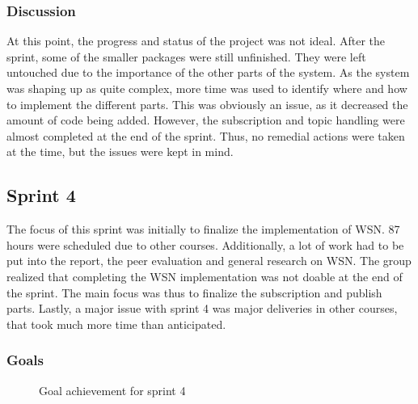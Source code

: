 \subsubsection{Discussion}

At this point, the progress and status of the project was not ideal. After the sprint, some of the smaller packages were still unfinished. They were left untouched due to the importance of the other parts of the system. As the system was shaping up as quite complex, more time was used to identify where and how to implement the different parts. This was obviously an issue, as it decreased the amount of code being added. However, the subscription and topic handling were almost completed at the end of the sprint. Thus, no remedial actions were taken at the time, but the issues were kept in mind.


\subsection{Sprint 4}

The focus of this sprint was initially to finalize the implementation of WSN. 87 hours were scheduled due to other courses. Additionally, a lot of work had to be put into the report, the peer evaluation and general research on WSN. The group realized that completing the WSN implementation was not doable at the end of the sprint. The main focus was thus to finalize the subscription and publish parts. Lastly, a major issue with sprint 4 was major deliveries in other courses, that took much more time than anticipated.

\subsubsection{Goals}

\begin{center}
  \begin{figure}[ht!]
    \caption{Goal achievement for sprint 4}
    \label{fig:sprint 4, goals}
  \end{figure}
\end{center}

